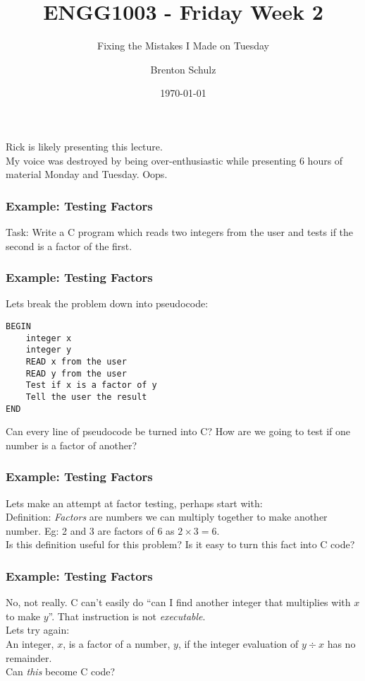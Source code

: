 \documentclass[14pt]{beamer}
\title{ENGG1003 - Friday Week 2}
\subtitle{Fixing the Mistakes I Made on Tuesday}
\author{Brenton Schulz}
\institute{University of Newcastle}
\date{\today}
\begin{document}
\titlepage

\begin{frame}
Rick is likely presenting this lecture. \\
\vspace{5mm}
My voice was destroyed by being over-enthusiastic while presenting 6 hours of material Monday and Tuesday. Oops.
\end{frame}

\begin{frame}
\frametitle{Example: Testing Factors}
Task: Write a C program which reads two integers from the user and tests if the second is a factor of the first.\\
\vspace{5mm}
\end{frame}

\begin{frame}[fragile]
\frametitle{Example: Testing Factors}
Lets break the problem down into pseudocode:
\begin{lstlisting}[style=pseudo]
BEGIN
	integer x
	integer y
	READ x from the user
	READ y from the user
	Test if x is a factor of y
	Tell the user the result
END
\end{lstlisting}
Can every line of pseudocode be turned into C? How are we going to test if one number is a factor of another?
\end{frame}

\begin{frame}
\frametitle{Example: Testing Factors}
Lets make an attempt at factor testing, perhaps start with:\\
\vspace{5mm}
Definition: \textit{Factors} are numbers we can multiply together to make another number. Eg: 2 and 3 are factors of 6 as $2 \times 3 = 6$.\\
\vspace{5mm}
Is this definition useful for this problem? Is it easy to turn this fact into C code?
\end{frame}

\begin{frame}
\frametitle{Example: Testing Factors}
No, not really. C can't easily do ``can I find another integer that multiplies with $x$ to make $y$''. That instruction is not \textit{executable}. \\
\vspace{5mm}
Lets try again: \\
\vspace{5mm}
An integer, $x$, is a factor of a number, $y$, if the integer evaluation of $y\div x$ has no remainder.\\
\vspace{5mm}
Can \textit{this} become C code?
\end{frame}
\end{document}
